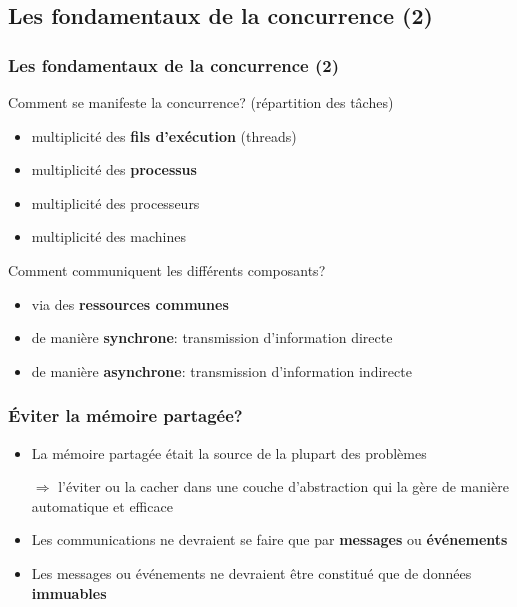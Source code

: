 \documentclass{beamer}
\begin{document}
\subsection{Les fondamentaux de la concurrence (2)}
\begin{frame}
  \frametitle{Les fondamentaux de la concurrence (2)}
  Comment se manifeste la concurrence? (répartition des tâches)
  \begin{itemize}
  \item multiplicité des \textbf{fils d'exécution} (threads)
  \item multiplicité des \textbf{processus}
  \item<2-> multiplicité des processeurs
  \item<2-> multiplicité des machines
  \end{itemize}

  Comment communiquent les différents composants?
  \begin{itemize}
  \item via des \textbf{ressources communes}
  \item<3-> de manière \textbf{synchrone}: transmission d'information directe
  \item<3-> de manière \textbf{asynchrone}: transmission d'information indirecte
  \end{itemize}
\end{frame} %
\begin{frame}
  \frametitle{Éviter la mémoire partagée?}
  \begin{itemize}
  \item La mémoire partagée était la source de la plupart des problèmes
    \par\bigskip
    $\Rightarrow$ l'éviter ou la cacher dans une couche d'abstraction qui la
    gère de manière automatique et efficace
  \item<2-> Les communications ne devraient se faire que par \textbf{messages} ou \textbf{événements}
  \item<3-> Les messages ou événements ne devraient être constitué que de données \textbf{immuables}
  \end{itemize}
\end{frame}
\end{document}
